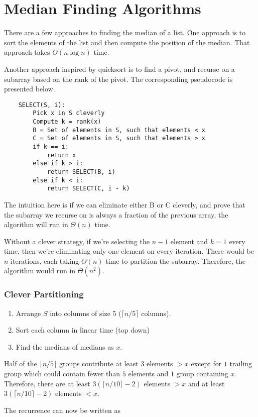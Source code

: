 \documentclass[12pt]{article}
\newcommand\ceil[1]{\lceil#1\rceil}
\begin{document}
\section*{Median Finding Algorithms}
\par{There are a few approaches to finding the median of a list.  One approach is to sort the elements of the list and then compute the position of the median. That approach takes $\Theta(n \log{n})$ time.}
\par{Another approach inspired by quicksort is to find a pivot, and recurse on a subarray based on the rank of the pivot. The corresponding pseudocode is presented below.}

\begin{lstlisting}
	SELECT(S, i):
		Pick x in S cleverly
		Compute k = rank(x)
		B = Set of elements in S, such that elements < x
		C = Set of elements in S, such that elements > x
		if k == i:
			return x
		else if k > i:
			return SELECT(B, i)
		else if k < i:
			return SELECT(C, i - k)	
\end{lstlisting}

\par{The intuition here is if we can eliminate either B or C cleverly, and prove that the subarray we recurse on is always a fraction of the previous array, the algorithm will run in $\Theta(n)$ time.}

Without a clever strategy, if we’re selecting the $n - 1$ element and $k = 1$ every time, then we’re eliminating only one element on every iteration. There would be $n$ iterations, each taking $\Theta(n)$ time to partition the subarray. Therefore, the algorithm would run in $\Theta(n^2)$.

\subsubsection*{Clever Partitioning}
\begin{enumerate}
\item Arrange $S$ into columns of size 5 ($\ceil{n / 5}$ columns).
\item Sort each column in linear time (top down)
\item Find the medians of medians as $x$.
\end{enumerate}

\par{Half of the $\ceil{n / 5}$ groups contribute at least 3 elements $> x$ except for $1$ trailing group which could contain fewer than $5$ elements and $1$ group containing $x$. Therefore, there are at least $3(\ceil{n / 10} - 2)$ elements $> x$ and at least $3(\ceil{n / 10} - 2)$ elements $< x$.}
\par{The recurrence can now be written as}
\end{document}
